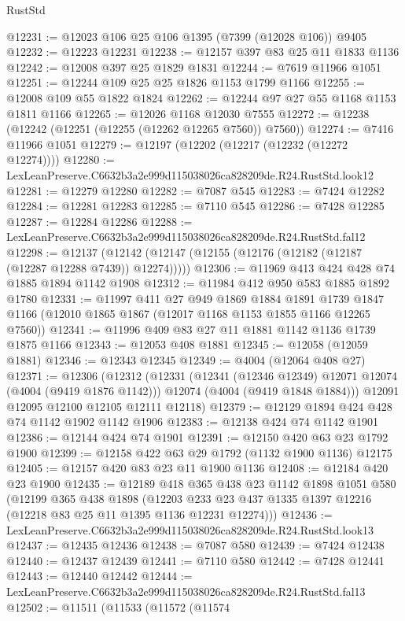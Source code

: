 \begin{lexlean}{RustStd}
\begin{coremodule}
@12231 := @12023 @106 @25 @106 @1395 (@7399 (@12028 @106)) @9405
@12232 := @12223 @12231
@12238 := @12157 @397 @83 @25 @11 @1833 @1136
@12242 := @12008 @397 @25 @1829 @1831
@12244 := @7619 @11966 @1051
@12251 := @12244 @109 @25 @25 @1826 @1153 @1799 @1166
@12255 := @12008 @109 @55 @1822 @1824
@12262 := @12244 @97 @27 @55 @1168 @1153 @1811 @1166
@12265 := @12026 @1168 @12030 @7555
@12272 := @12238 (@12242 (@12251 (@12255 (@12262 @12265 @7560)) @7560))
@12274 := @7416 @11966 @1051
@12279 := @12197 (@12202 (@12217 (@12232 (@12272 @12274))))
@12280 := LexLeanPreserve.C6632b3a2e999d115038026ca828209de.R24.RustStd.look12
@12281 := @12279 @12280
@12282 := @7087 @545
@12283 := @7424 @12282
@12284 := @12281 @12283
@12285 := @7110 @545
@12286 := @7428 @12285
@12287 := @12284 @12286
@12288 := LexLeanPreserve.C6632b3a2e999d115038026ca828209de.R24.RustStd.fal12
@12298 := @12137 (@12142 (@12147 (@12155 (@12176 (@12182 (@12187 (@12287 @12288 @7439)) @12274)))))
@12306 := @11969 @413 @424 @428 @74 @1885 @1894 @1142 @1908
@12312 := @11984 @412 @950 @583 @1885 @1892 @1780
@12331 := @11997
    @411
    @27
    @949
    @1869
    @1884
    @1891
    @1739
    @1847
    @1166
    (@12010 @1865 @1867 (@12017 @1168 @1153 @1855 @1166 @12265 @7560))
@12341 := @11996 @409 @83 @27 @11 @1881 @1142 @1136 @1739 @1875 @1166
@12343 := @12053 @408 @1881
@12345 := @12058 (@12059 @1881)
@12346 := @12343 @12345
@12349 := @4004 (@12064 @408 @27)
@12371 := @12306
    (@12312
      (@12331
        (@12341 (@12346 @12349) @12071 @12074 (@4004 (@9419 @1876 @1142)))
        @12074
        (@4004 (@9419 @1848 @1884)))
      @12091
      @12095
      @12100
      @12105
      @12111
      @12118)
@12379 := @12129 @1894 @424 @428 @74 @1142 @1902 @1142 @1906
@12383 := @12138 @424 @74 @1142 @1901
@12386 := @12144 @424 @74 @1901
@12391 := @12150 @420 @63 @23 @1792 @1900
@12399 := @12158 @422 @63 @29 @1792 (@1132 @1900 @1136) @12175
@12405 := @12157 @420 @83 @23 @11 @1900 @1136
@12408 := @12184 @420 @23 @1900
@12435 := @12189
    @418
    @365
    @438
    @23
    @1142
    @1898
    @1051
    @580
    (@12199
      @365
      @438
      @1898
      (@12203 @233 @23 @437 @1335 @1397 @12216 (@12218 @83 @25 @11 @1395 @1136 @12231 @12274)))
@12436 := LexLeanPreserve.C6632b3a2e999d115038026ca828209de.R24.RustStd.look13
@12437 := @12435 @12436
@12438 := @7087 @580
@12439 := @7424 @12438
@12440 := @12437 @12439
@12441 := @7110 @580
@12442 := @7428 @12441
@12443 := @12440 @12442
@12444 := LexLeanPreserve.C6632b3a2e999d115038026ca828209de.R24.RustStd.fal13
@12502 := @11511
    (@11533
      (@11572
        (@11574

\end{coremodule}
\end{lexlean}
